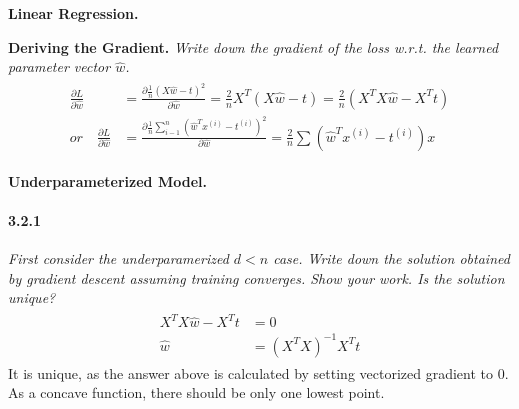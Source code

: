 \documentclass{myhw}
\begin{document}
\begin{homeworkProblem}
\textbf{Linear Regression.}
\begin{homeworkSection}
\textbf{Deriving the Gradient.} 
\emph{Write down the gradient of the loss w.r.t. the learned parameter vector $\hat{w}$.} 
\begin{gather*}
\begin{aligned}
\frac{\partial L}{\partial \hat{w}} &= \frac{\partial \frac{1}{n} (X\hat{w} - t)^2}{\partial \hat{w}} = \frac{2}{n} X^T (X\hat{w} - t) = \frac{2}{n} (X^TX\hat{w} - X^Tt) \\
or \quad \frac{\partial L}{\partial \hat{w}} &= \frac{\partial \frac{1}{n} \sum_{i-1}^n (\hat{w}^T x^{(i)} - t^{(i)})^2}{\partial \hat{w}} = \frac{2}{n} \sum (\hat{w}^T x^{(i)} - t^{(i)}) x
\end{aligned}
\end{gather*}
\end{homeworkSection}
\begin{homeworkSection}
\textbf{Underparameterized Model.}
\paragraph{3.2.1} \emph{First consider the underparamerized $d < n$ case. Write down the solution obtained by gradient descent assuming training converges. Show your work. Is the solution unique?}
\begin{gather*}
\begin{aligned}
X^TX\hat{w} - X^Tt &= 0 \\
\hat{w} &= (X^TX)^{-1} X^Tt
\end{aligned}
\end{gather*}
It is unique, as the answer above is calculated by setting vectorized gradient to 0. As a concave function, there should be only one lowest point.

\end{homeworkSection}
\end{homeworkProblem}
\end{document}
